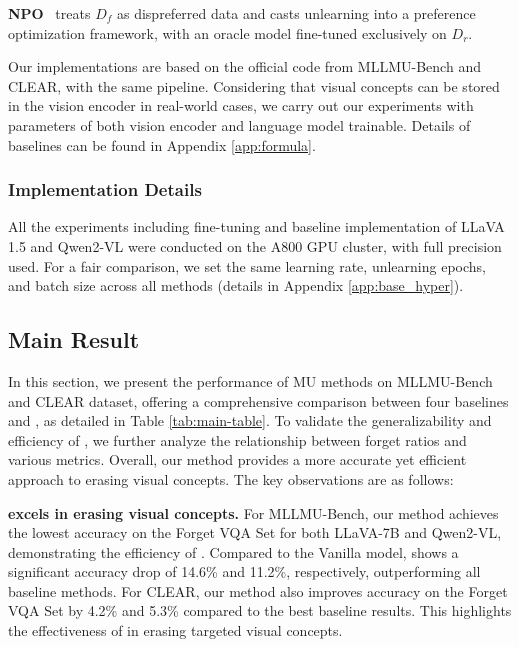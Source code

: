 \textbf{NPO}~\cite{zhang2024npo} treats $D_f$ as dispreferred data and casts unlearning into a preference optimization framework, with an oracle model fine-tuned exclusively on $D_r$. 

Our implementations are based on the official code from MLLMU-Bench and CLEAR, with the same pipeline. Considering that visual concepts can be stored in the vision encoder in real-world cases, we carry out our experiments with parameters of both vision encoder and language model trainable. Details of baselines can be found in Appendix \ref{app:formula}.

\subsubsection{Implementation Details}
All the experiments including fine-tuning and baseline implementation of LLaVA 1.5 and Qwen2-VL were conducted on the A800 GPU cluster, with full precision used. For a fair comparison, we set the same learning rate, unlearning epochs, and batch size across all methods (details in Appendix \ref{app:base_hyper}).
\subsection{Main Result}
In this section, we present the performance of MU methods on MLLMU-Bench and CLEAR dataset, offering a comprehensive comparison between four baselines and \method, as detailed in Table \ref{tab:main-table}. To validate the generalizability and efficiency of \method, we further analyze the relationship between forget ratios and various metrics. Overall, our method provides a more accurate yet efficient approach to erasing visual concepts. The key observations are as follows:


 \textbf{\method excels in erasing visual concepts.}
For MLLMU-Bench, our method achieves the lowest accuracy on the Forget VQA Set for both LLaVA-7B and Qwen2-VL, demonstrating the efficiency of \method. Compared to the Vanilla model, \method shows a significant accuracy drop of 14.6\% and 11.2\%, respectively, outperforming all baseline methods. For CLEAR, our method also improves accuracy on the Forget VQA Set by 4.2\% and 5.3\% compared to the best baseline results. This highlights the effectiveness of \method in erasing targeted visual concepts.

